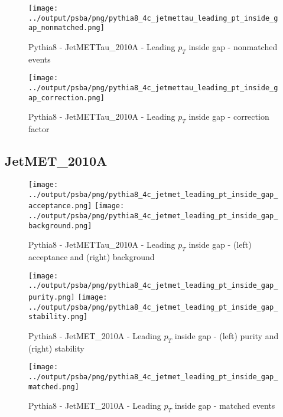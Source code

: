 \documentclass[11pt]{book}
\begin{document}
\begin{figure}[ht]
\centering
\texttt{[image: ../output/psba/png/pythia8\_4c\_jetmettau\_leading\_pt\_inside\_gap\_nonmatched.png]}
\caption{Pythia8 - JetMETTau\_2010A - Leading $p_{T}$ inside gap - nonmatched events}
\label{fig:p8_jetmettau_leading_pt_inside_gap_nonmatched}
\end{figure}

\begin{figure}[ht]
\centering
\texttt{[image: ../output/psba/png/pythia8\_4c\_jetmettau\_leading\_pt\_inside\_gap\_correction.png]}
\caption{Pythia8 - JetMETTau\_2010A - Leading $p_{T}$ inside gap - correction factor}
\label{fig:p8_jetmettau_leading_pt_inside_gap_correction}
\end{figure}



\clearpage
\subsection{JetMET\_2010A}

\begin{figure}[ht]
\centering
\texttt{[image: ../output/psba/png/pythia8\_4c\_jetmet\_leading\_pt\_inside\_gap\_acceptance.png]}
\texttt{[image: ../output/psba/png/pythia8\_4c\_jetmet\_leading\_pt\_inside\_gap\_background.png]}
\caption{Pythia8 - JetMETTau\_2010A - Leading $p_{T}$ inside gap - (left) acceptance and (right) background}
\label{fig:p8_jetmettau_leading_pt_inside_gap_ab}
\end{figure}

\begin{figure}[ht]
\centering
\texttt{[image: ../output/psba/png/pythia8\_4c\_jetmet\_leading\_pt\_inside\_gap\_purity.png]}
\texttt{[image: ../output/psba/png/pythia8\_4c\_jetmet\_leading\_pt\_inside\_gap\_stability.png]}
\caption{Pythia8 - JetMET\_2010A - Leading $p_{T}$ inside gap - (left) purity and (right) stability}
\label{fig:p8_jetmet_leading_pt_inside_gap_ps}
\end{figure}

\begin{figure}[ht]
\centering
\texttt{[image: ../output/psba/png/pythia8\_4c\_jetmet\_leading\_pt\_inside\_gap\_matched.png]}
\caption{Pythia8 - JetMET\_2010A - Leading $p_{T}$ inside gap - matched events}
\label{fig:p8_jetmet_leading_pt_inside_gap_matched}
\end{figure}
\end{document}
